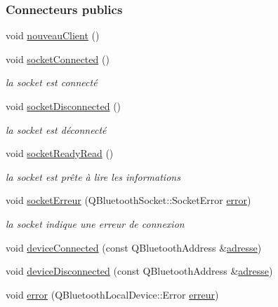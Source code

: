 \subsubsection*{Connecteurs publics}
\begin{DoxyCompactItemize}
\item 
void \hyperlink{class_communication_bluetooth_ab88c9bb8a1bd2c68e3d14fc3615be888}{nouveau\+Client} ()
\item 
void \hyperlink{class_communication_bluetooth_ab4b02673b1d6ffd5970f9546360b25e7}{socket\+Connected} ()
\begin{DoxyCompactList}\small\item\em la socket est connecté \end{DoxyCompactList}\item 
void \hyperlink{class_communication_bluetooth_a87e96f5362c1334adb3c930566ca9b88}{socket\+Disconnected} ()
\begin{DoxyCompactList}\small\item\em la socket est déconnecté \end{DoxyCompactList}\item 
void \hyperlink{class_communication_bluetooth_a28b131a307d4a799f4f8d7b6969fa9ca}{socket\+Ready\+Read} ()
\begin{DoxyCompactList}\small\item\em la socket est prête à lire les informations \end{DoxyCompactList}\item 
void \hyperlink{class_communication_bluetooth_a41a4f8ab7deffd296d04018db20314a1}{socket\+Erreur} (Q\+Bluetooth\+Socket\+::\+Socket\+Error \hyperlink{class_communication_bluetooth_a6e0d7054012e11af9d55d6d4f5764259}{error})
\begin{DoxyCompactList}\small\item\em la socket indique une erreur de connexion \end{DoxyCompactList}\item 
void \hyperlink{class_communication_bluetooth_a046af482ca42ce0071aee1b2cf3a1a44}{device\+Connected} (const Q\+Bluetooth\+Address \&\hyperlink{class_communication_bluetooth_a20fd97fb70e36e0dfb8dadcc25484302}{adresse})
\item 
void \hyperlink{class_communication_bluetooth_aaaeaea386c629e980580072f7221b9f0}{device\+Disconnected} (const Q\+Bluetooth\+Address \&\hyperlink{class_communication_bluetooth_a20fd97fb70e36e0dfb8dadcc25484302}{adresse})
\item 
void \hyperlink{class_communication_bluetooth_a6e0d7054012e11af9d55d6d4f5764259}{error} (Q\+Bluetooth\+Local\+Device\+::\+Error \hyperlink{class_communication_bluetooth_a90c5c3c42145bad0f80a7a75d98dc253}{erreur})

\end{DoxyCompactItemize}

